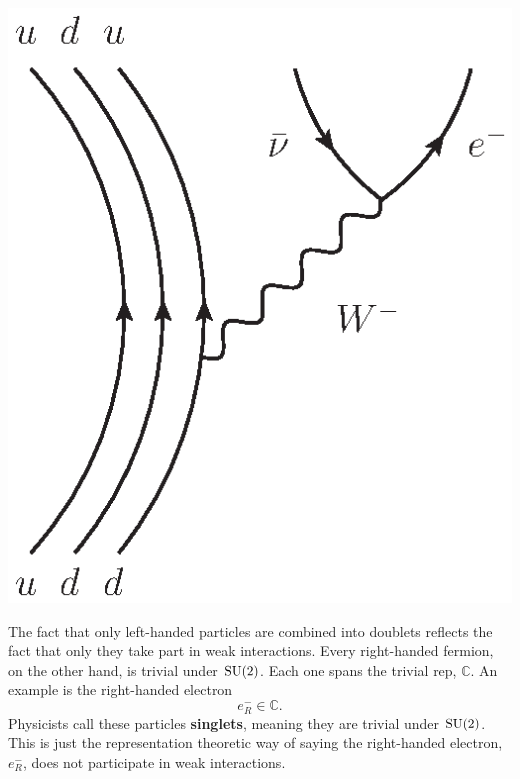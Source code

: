 \documentclass[12pt]{article}
\newcommand{\C}{{\mathbb C}}  %
\newcommand{\SU}{{\rm SU}}    %
\begin{document}
\begin{center}
	\includegraphics[scale=0.75]{betadecay}
\end{center}

The fact that only left-handed particles are combined into doublets reflects
the fact that only they take part in weak interactions. Every right-handed
fermion, on the other hand, is trivial under $\SU(2)$. Each one spans the
trivial rep, $\C$.  An example is the right-handed electron 
\[              e^-_R \in \C  .\]
Physicists call these particles \textbf{singlets}, meaning they are 
trivial under $\SU(2)$. This is just the representation theoretic way of 
saying the right-handed electron, $e^-_R$, does not participate in weak 
interactions.
\end{document}
